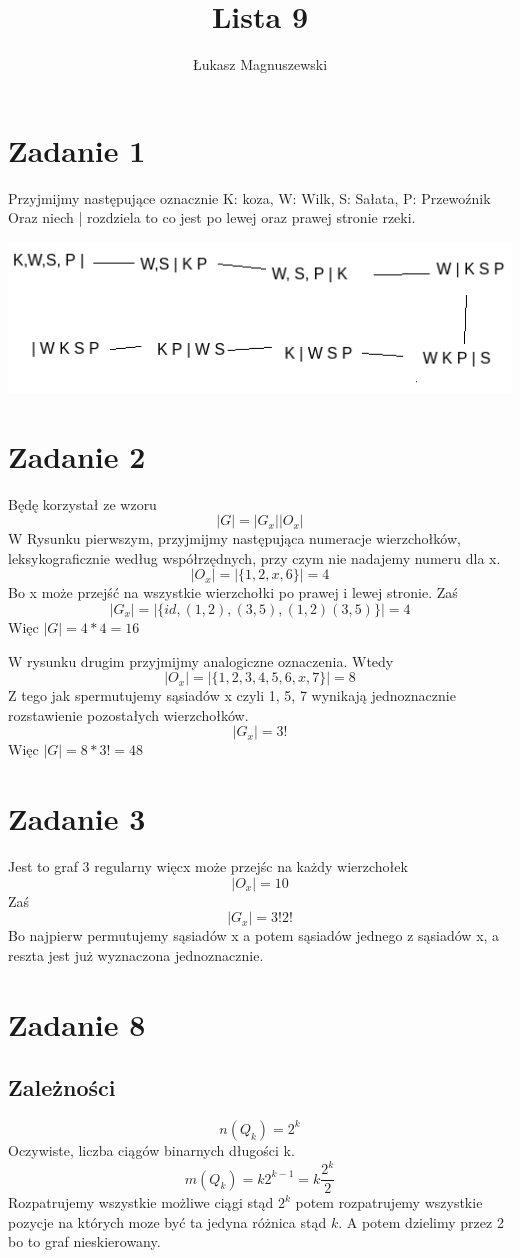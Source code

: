\documentclass{article}
\title{Lista 9}
\author{Łukasz Magnuszewski}
\date{\vspace{-5ex}}
\begin{document}
\maketitle

\section*{Zadanie 1}
Przyjmijmy następujące oznacznie
K: koza,
W: Wilk,
S: Sałata,
P: Przewoźnik
Oraz niech | rozdziela to co jest po lewej oraz prawej stronie rzeki.

\includegraphics{koza}
\section*{Zadanie 2}
Będę korzystał ze wzoru
\[
  |G| = |G_x| | O_x|
\]
W Rysunku pierwszym, przyjmijmy następująca numeracje wierzchołków, leksykograficznie według współrzędnych, przy czym nie nadajemy numeru dla x.
\[
  |O_x| = |\{1, 2, x, 6\}| = 4
\]
Bo x może przejść na wszystkie wierzchołki po prawej i lewej stronie.
Zaś 
\[
  |G_x| = |\{id, (1,2), (3,5), (1,2)(3,5)\}| = 4
\]
Więc $|G| = 4 * 4 = 16$


W rysunku drugim przyjmijmy analogiczne oznaczenia. Wtedy
\[
  |O_x| = |\{1, 2, 3, 4, 5, 6, x, 7\}| = 8
\]
Z tego jak spermutujemy sąsiadów x czyli 1, 5, 7 wynikają jednoznacznie rozstawienie pozostałych wierzchołków.
\[
  |G_x| = 3!
\]
Więc $|G| = 8 * 3! = 48$
\section*{Zadanie 3}
Jest to graf 3 regularny więcx może przejśc na każdy wierzchołek
\[
  |O_x| = 10
\]
Zaś 
\[
  |G_x| = 3! 2!
\]
Bo najpierw permutujemy sąsiadów x a potem sąsiadów jednego z sąsiadów x, a reszta jest już wyznaczona jednoznacznie.

\section*{Zadanie 8}
\subsection*{Zależności}
\[
n(Q_k) = 2^k  
\]
Oczywiste, liczba ciągów binarnych długości k.
\[
m(Q_k) = k 2^{k-1}  = k \frac{2^k}{2}
\]
Rozpatrujemy wszystkie możliwe ciągi stąd $2^k$ potem rozpatrujemy wszystkie pozycje na których moze być ta jedyna różnica stąd $k$. A potem dzielimy przez 2 bo to graf nieskierowany.
\end{document}
